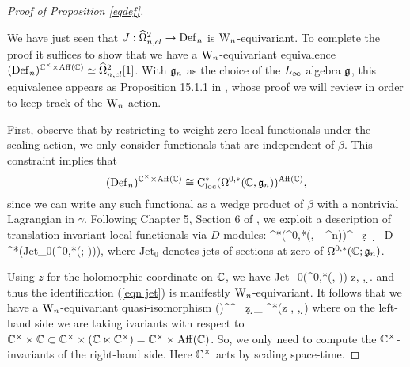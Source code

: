 \begin{proof}[Proof of Proposition \ref{eqdef}]
\label{seceqdef}

We have just seen that $J : \widehat{\Omega}^2_{n,cl} \to {\rm Def}_n$ is
${{\rm W}_n}$-equivariant. To complete the proof it suffices to show that we have a ${{\rm W}_n}$-equivariant equivalence $({\rm Def}_n)^{\mathbb C^\times \times {\rm
    Aff}(\mathbb C)} \simeq \widehat{\Omega}^2_{n,cl}[1]$. With $\mathfrak{g}_n$ as the choice of the $\L8$ algebra $\mathfrak g$, 
this equivalence appears as Proposition 15.1.1 in \cite{WG2},
whose proof we will review in order to keep track of the ${{\rm W}_n}$-action. 

First, observe that by restricting to weight zero local functionals under the scaling action, 
we only consider functionals that are independent of $\beta$.
This constraint implies that 
\[
({\rm Def}_n)^{\mathbb C^\times \times {\rm Aff}(\mathbb C)} \cong {\rm C}^*_{\rm loc}(\Omega^{0,*}(\mathbb C, \mathfrak{g}_n))^{{\rm Aff}(\mathbb C)},
\] 
since we can write any such functional as a wedge product of $\beta$ with a nontrivial Lagrangian in $\gamma$.
Following Chapter 5, Section 6 of \cite{CosBook}, we exploit a
description of translation invariant local functionals via $D$-modules:
\be\label{eqn jet}
\Cloc^*\left(\Omega^{0,*}(\CC, \fg_{\hD^n})\right)^\CC 
\cong \CC \, \d z \, \d \zbar \otimes_{D_{\CC}} \Cred^*\left({\rm Jet}_0(\Omega^{0,*}(\CC ; \fgn))\right),
\ee
where $\text{Jet}_0$ denotes jets of sections at zero of
$\Omega^{0,*}(\mathbb C ; \mathfrak g_n)$. 

Using $z$ for the holomorphic coordinate on $\mathbb C$, we have
\ben
{\rm Jet}_0(\Omega^{0,*}(\CC, \fgn)) \cong \fgn \llbracket z, \zbar, \d \zbar \rrbracket.
\een 
and thus the identification (\ref{eqn jet}) is manifestly ${{\rm W}_n}$-equivariant. 
It follows that we have a ${{\rm W}_n}$-equivariant quasi-isomorphism
\ben
(\Def)^{\CC^\times \times \CC} \simeq \CC\, \d z \wedge \d \zbar \otimes_{} \Cred^*(\fgn\llbracket z , \zbar, \d \zbar \rrbracket)
\een
where on the left-hand side we are taking ivariants with respect to $\mathbb C^\times \times \mathbb C \subset \mathbb C^\times \times (\mathbb C \ltimes \mathbb C^\times) = \mathbb C^\times \times {\rm Aff}(\mathbb C)$. So, we only need to compute the $\mathbb C^\times$-invariants of the right-hand side. Here $\mathbb C^\times$ acts by scaling space-time.


\end{proof}
